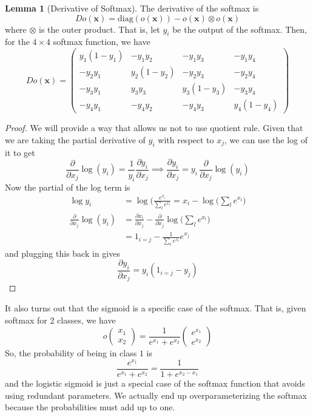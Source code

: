 \documentclass{article}
\theoremstyle{definition}
\newtheorem{lemma}[theorem]{Lemma}
\begin{document}
  \begin{lemma}[Derivative of Softmax]
  The derivative of the softmax is 
  \[D o (\mathbf{x}) = \mathrm{diag}(o (\mathbf{x})) - o (\mathbf{x}) \otimes o (\mathbf{x})\]
  where $\otimes$ is the outer product. That is, let $y_i$ be the output of the softmax. Then, for the $4 \times 4$ softmax function, we have 
  \[D o(\mathbf{x}) = \begin{pmatrix} y_1 (1 - y_1) & - y_1 y_2 & -y_1 y_3 & - y_1 y_4 \\ -y_2 y_1 & y_2 (1 - y_2) & - y_2 y_3 & - y_2 y_4 \\ -y_3 y_1 & y_3 y_3 & y_3 (1 - y_3) & -y_3 y_4 \\ -y_4 y_1 & -y_4 y_2 & -y_4 y_3 & y_4 (1 - y_4) \end{pmatrix} \]
  \end{lemma}
  \begin{proof}
  We will provide a way that allows us not to use quotient rule. Given that we are taking the partial derivative of $y_i$ with respect to $x_j$, we can use the log of it to get 
  \[\frac{\partial}{\partial x_j} \log (y_i) = \frac{1}{y_i} \frac{\partial y_i}{\partial x_j} \implies \frac{\partial y_i}{\partial x_j} = y_i \, \frac{\partial}{\partial x_j} \log(y_i)\]
  Now the partial of the log term is 
  \begin{align*}
      \log{y_i} & = \log \bigg( \frac{e^{x_i}}{\sum_l e^{x_l}} = x_i - \log \bigg( \sum_l e^{x_l}\bigg) \\
      \frac{\partial}{\partial x_j} \log(y_i) & = \frac{\partial x_i}{\partial x_j} - \frac{\partial}{\partial x_j} \log \bigg( \sum_l e^{x_l}\bigg) \\
      & = 1_{i = j} - \frac{1}{\sum_l e^{x_l}} e^{x_j}
  \end{align*}
  and plugging this back in gives 
  \[\frac{\partial y_i}{\partial x_j} = y_i (1_{i = j} - y_j)\]
  \end{proof}

  It also turns out that the sigmoid is a specific case of the softmax. That is, given softmax for 2 classes, we have 
  \[o\begin{pmatrix} x_1 \\ x_2 \end{pmatrix} = \frac{1}{e^{x_1} + e^{x_2}} \begin{pmatrix} e^{x_1} \\ e^{x_2} \end{pmatrix}\]
  So, the probability of being in class $1$ is 
  \[\frac{e^{x_1}}{e^{x_1} + e^{x_2}} = \frac{1}{1 + e^{x_2 - x_1}}\]
  and the logistic sigmoid is just a special case of the softmax function that avoids using redundant parameters. We actually end up overparameterizing the softmax because the probabilities must add up to one. 
\end{document}
